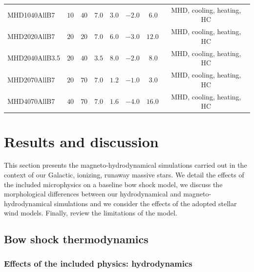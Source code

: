 \documentclass[useAMS,usenatbib]{mn2e}
\begin{document}
\begin{table}
\begin{tabular}{lccccccc}
	MHD1040AllB7     &  $10$  &  $40$ & $7.0$   &  $3.0$   &  $-2.0$     &  $~6.0$   & MHD, cooling, heating, HC  \\         	
	MHD2020AllB7     &  $20$  &  $20$ & $7.0$   &  $6.0$   &  $-3.0$     &  $12.0$  & MHD, cooling, heating, HC  \\         
	MHD2040AllB3.5   &  $20$  &  $40$ & $3.5$   &  $8.0$   &  $-2.0$     &  $~8.0$   & MHD, cooling, heating, HC  \\  
	MHD2070AllB7     &  $20$  &  $70$ & $7.0$   &  $1.2$   &  $-1.0$     &  $~3.0$   & MHD, cooling, heating, HC  \\     
	MHD4070AllB7     &  $40$  &  $70$ & $7.0$   &  $1.6$   &  $-4.0$     &  $16.0$  & MHD, cooling, heating, HC  \\
	\hline    
	\end{tabular}
\label{tab:ms}
\end{table}




\section{Results and discussion}
\label{sect:results}


This section presents the magneto-hydrodynamical simulations carried out in the
context of our Galactic, ionizing, runaway massive stars. We detail the
effects of the included microphysics on a baseline bow shock model,  
we discuss the morphological differences between our hydrodynamical and 
magneto-hydrodynamical simulations and we consider the 
effects of the adopted stellar wind models. 
Finally, review the limitations of the model. 



\subsection{Bow shock thermodynamics}
\label{sect:physics1}


\subsubsection{Effects of the included physics: hydrodynamics}
\label{sect:physics1}
\end{document}
